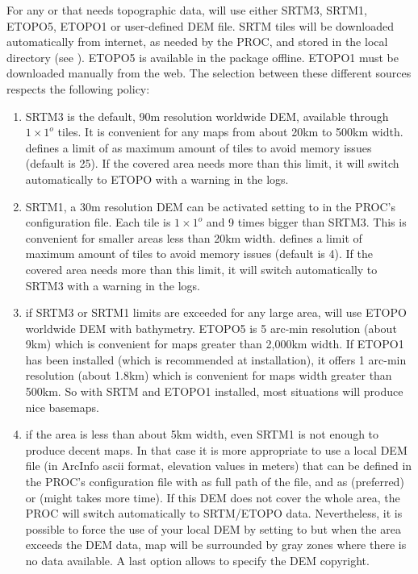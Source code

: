 For any  or  that needs topographic data, \webobs will use either SRTM3, SRTM1, ETOPO5, ETOPO1 or user-defined DEM file. SRTM tiles will be downloaded automatically from internet, as needed by the PROC, and stored in the  local directory (see ). ETOPO5 is available in the \webobs package offline. ETOPO1 must be downloaded manually from the web. The selection between these different sources respects the following policy:
\begin{enumerate}

\item SRTM3 is the default, 90m resolution worldwide DEM, available through $1\times1^o$ tiles. It is convenient for any maps from about 20km to 500km width.  defines a limit of  as maximum amount of tiles to avoid memory issues (default is 25). If the covered area needs more than this limit, it will switch automatically to ETOPO with a warning in the logs.

\item SRTM1, a 30m resolution DEM can be activated setting  to  in the PROC's configuration file. Each tile is $1\times1^o$ and 9 times bigger than SRTM3. This is convenient for smaller areas less than 20km width.  defines a limit of  maximum amount of tiles to avoid memory issues (default is 4). If the covered area needs more than this limit, it will switch automatically to SRTM3 with a warning in the logs.

\item if SRTM3 or SRTM1 limits are exceeded for any large area, \webobs will use ETOPO worldwide DEM with bathymetry. ETOPO5 is 5 arc-min resolution (about 9km) which is convenient for maps greater than 2,000km width. If ETOPO1 has been installed (which is recommended at installation), it offers 1 arc-min resolution (about 1.8km) which is convenient for maps width greater than 500km. So with SRTM and ETOPO1 installed, most situations will produce nice basemaps.

\item if the area is less than about 5km width, even SRTM1 is not enough to produce decent maps. In that case it is more appropriate to use a local DEM file (in ArcInfo ascii format, elevation values in meters) that can be defined in the PROC's configuration file with  as full path of the file, and  as  (preferred) or  (might takes more time). If this DEM does not cover the whole area, the PROC will switch automatically to SRTM/ETOPO data. Nevertheless, it is possible to force the use of your local DEM by setting  to  but when the area exceeds the DEM data, map will be surrounded by gray zones where there is no data available. A last option  allows to specify the DEM copyright.

\end{enumerate}



